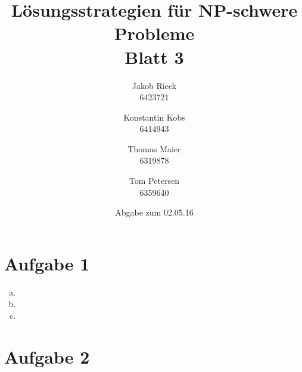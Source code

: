 \documentclass[12pt,a4paper]{article}
\title{Lösungsstrategien für NP-schwere Probleme\\Blatt 3}
\author{
		Jakob Rieck\\
		\small{6423721}
	\and
		Konstantin Kobs\\
		\small{6414943}
	\and
		Thomas Maier\\
		\small{6319878}
	\and
		Tom Petersen\\
		\small{6359640}
}
\date{Abgabe zum 02.05.16}
\begin{document}
\maketitle

\section*{Aufgabe 1}

 \begin{enumerate}[a)]

 	\item 

	\item

	\item 

\end{enumerate}

\section*{Aufgabe 2}
\end{document}
